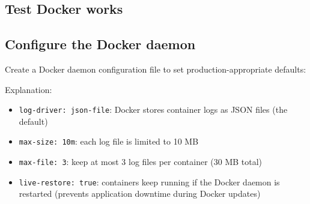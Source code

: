 \subsection*{Test Docker works}\label{21-system-setup:test-docker-works}

\begin{codebox}[short]

\begin{Shaded}
\begin{Highlighting}[]
\end{Highlighting}
\end{Shaded}

\end{codebox}

\subsection*{Configure the Docker daemon}\label{21-system-setup:configure-the-docker-daemon}

Create a Docker daemon configuration file to set production-appropriate defaults:

\begin{codebox}[short]

\begin{Shaded}
\begin{Highlighting}[]
 \OperatorTok{\textgreater{}}
\StringTok{\{}
\StringTok{  \},}
\StringTok{\}}
\end{Highlighting}
\end{Shaded}

\end{codebox}

\noindent{}Explanation:

\begin{itemize}
\tightlist
\item
  \texttt{log-driver:\ json-file}: Docker stores container logs as JSON files (the default)
\item
  \texttt{max-size:\ 10m}: each log file is limited to 10 MB
\item
  \texttt{max-file:\ 3}: keep at most 3 log files per container (30 MB total)
\item
  \texttt{live-restore:\ true}: containers keep running if the Docker daemon is restarted (prevents application downtime during Docker updates)
\end{itemize}

